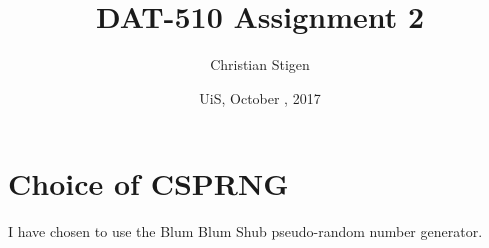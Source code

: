 \documentclass[a4paper,english,12pt]{article}
\title{DAT-510 Assignment 2}
\author{Christian Stigen}
\date{UiS, October \nth{9}, 2017}
\begin{document}
\maketitle

\begin{abstract}
\end{abstract}

\section{Choice of CSPRNG}
I have chosen to use the Blum Blum Shub \cite{bbs} pseudo-random number
generator.



\end{document}
